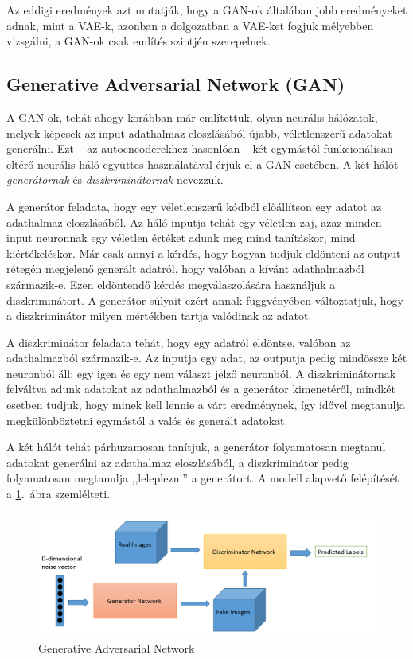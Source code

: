 Az eddigi eredmények azt mutatják, hogy a GAN-ok általában jobb eredményeket adnak, mint a VAE-k, azonban a dolgozatban a VAE-ket fogjuk mélyebben vizsgálni, a GAN-ok csak említés szintjén szerepelnek.

\subsection{Generative Adversarial Network (GAN)}

A GAN-ok, tehát ahogy korábban már említettük, olyan neurális hálózatok, melyek képesek az input adathalmaz eloszlásából újabb, véletlenszerű adatokat generálni. Ezt -- az autoencoderekhez hasonlóan -- két egymástól funkcionálisan eltérő neurális háló együttes használatával érjük el a GAN esetében. A két hálót \textit{generátornak} és \textit{diszkriminátornak} nevezzük.

A generátor feladata, hogy egy véletlenszerű kódból előállítson egy adatot az adathalmaz eloszlásából. Az háló inputja tehát egy véletlen zaj, azaz minden input neuronnak egy véletlen értéket adunk meg mind tanításkor, mind kiértékeléskor. Már csak annyi a kérdés, hogy hogyan tudjuk eldönteni az output rétegén megjelenő generált adatról, hogy valóban a kívánt adathalmazból származik-e. Ezen eldöntendő kérdés megválaszolására használjuk a diszkriminátort. A generátor súlyait ezért annak függvényében változtatjuk, hogy a diszkriminátor milyen mértékben tartja valódinak az adatot.

A diszkriminátor feladata tehát, hogy egy adatról eldöntse, valóban az adathalmazból származik-e. Az inputja egy adat, az outputja pedig mindössze két neuronból áll: egy igen és egy nem választ jelző neuronból. A diszkriminátornak felváltva adunk adatokat az adathalmazból és a generátor kimenetéről, mindkét esetben tudjuk, hogy minek kell lennie a várt eredménynek, így idővel megtanulja megkülönböztetni egymástól a valós és generált adatokat. 

A két hálót tehát párhuzamosan tanítjuk, a generátor folyamatosan megtanul adatokat generálni az adathalmaz eloszlásából, a diszkriminátor pedig folyamatosan megtanulja ,,leleplezni'' a generátort. A modell alapvető felépítését a \ref{gan}.~ábra szemlélteti.

\begin{figure}[h!]
\begin{center}
 
  
	\begin{center}
	\includegraphics[width=\linewidth]{gan.png}
	\end{center}
	
  \caption{Generative Adversarial Network} \label{gan}
\end{center}
\end{figure}

